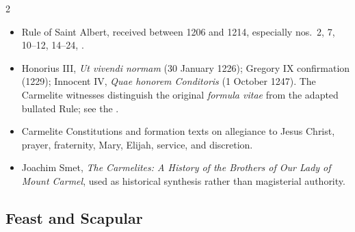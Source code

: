\begin{multicols}{2}
\begin{itemize}
\item Rule of Saint Albert, received between 1206 and 1214, especially nos.~2, 7, 10--12, 14--24, .
\item Honorius III, \textit{Ut vivendi normam} (30 January 1226); Gregory IX confirmation (1229); Innocent IV, \textit{Quae honorem Conditoris} (1 October 1247). The Carmelite witnesses distinguish the original \textit{formula vitae} from the adapted bullated Rule; see the .
\item Carmelite Constitutions and formation texts on allegiance to Jesus Christ, prayer, fraternity, Mary, Elijah, service, and discretion.
\item Joachim Smet, \textit{The Carmelites: A History of the Brothers of Our Lady of Mount Carmel}, used as historical synthesis rather than magisterial authority.
\end{itemize}

\subsection{Feast and Scapular}


\end{multicols}
